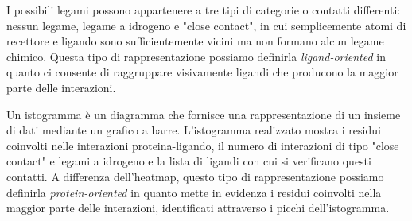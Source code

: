 I possibili legami possono appartenere a tre tipi di categorie o contatti differenti: nessun legame, legame a idrogeno e "close contact", in cui semplicemente atomi di recettore e ligando sono sufficientemente vicini ma non formano alcun legame chimico. 
Questa tipo di rappresentazione possiamo definirla \textit{ligand-oriented} in quanto ci consente di raggruppare visivamente ligandi che producono la maggior parte delle interazioni.

Un istogramma è un diagramma che fornisce una rappresentazione di un insieme di dati mediante un grafico a barre. L'istogramma realizzato mostra i residui coinvolti nelle interazioni proteina-ligando, il numero di interazioni di tipo "close contact" e legami a idrogeno e la lista di ligandi con cui si verificano questi contatti.
A differenza dell'heatmap, questo tipo di rappresentazione possiamo definirla \textit{protein-oriented} in quanto mette in evidenza i residui coinvolti nella maggior parte delle interazioni, identificati attraverso i picchi dell'istogramma.



